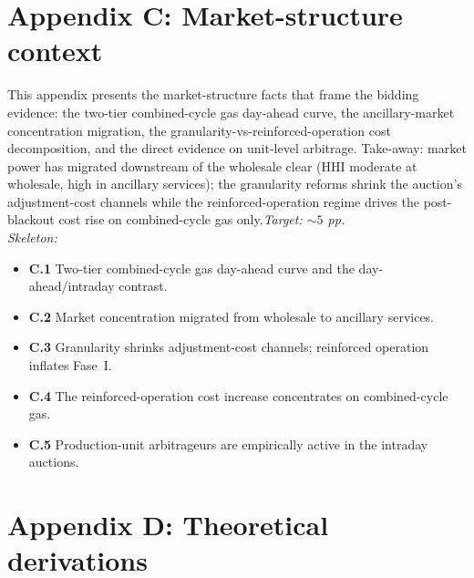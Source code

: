\documentclass[11pt]{article}
\begin{document}
\section*{Appendix C: Market-structure context}

This appendix presents the market-structure facts that frame the bidding evidence: the two-tier combined-cycle gas day-ahead curve, the ancillary-market concentration migration, the granularity-vs-reinforced-operation cost decomposition, and the direct evidence on unit-level arbitrage. Take-away: market power has migrated downstream of the wholesale clear (HHI moderate at wholesale, high in ancillary services); the granularity reforms shrink the auction's adjustment-cost channels while the reinforced-operation regime drives the post-blackout cost rise on combined-cycle gas only.\hfill\emph{Target: $\sim 5$ pp.}
\\\emph{Skeleton:}
\begin{itemize}
  \item \textbf{C.1} Two-tier combined-cycle gas day-ahead curve and the day-ahead/intraday contrast.
  \item \textbf{C.2} Market concentration migrated from wholesale to ancillary services.
  \item \textbf{C.3} Granularity shrinks adjustment-cost channels; reinforced operation inflates Fase~I.
  \item \textbf{C.4} The reinforced-operation cost increase concentrates on combined-cycle gas.
  \item \textbf{C.5} Production-unit arbitrageurs are empirically active in the intraday auctions.
\end{itemize}

\section*{Appendix D: Theoretical derivations}
\end{document}
